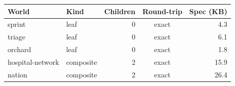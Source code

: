 \begin{tabular}{llrcr}
\toprule
World & Kind & Children & Round-trip & Spec (KB) \\
\midrule
sprint & leaf & 0 & exact & 4.3 \\
triage & leaf & 0 & exact & 6.1 \\
orchard & leaf & 0 & exact & 1.8 \\
hospital-network & composite & 2 & exact & 15.9 \\
nation & composite & 2 & exact & 26.4 \\
\bottomrule
\end{tabular}
